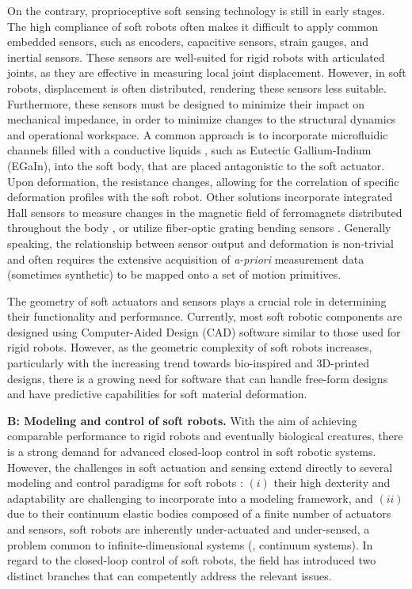On the contrary, proprioceptive soft sensing technology is still in early stages. The high compliance of soft robots often makes it difficult to apply common embedded sensors, such as encoders, capacitive sensors, strain gauges, and inertial sensors. These sensors are well-suited for rigid robots with articulated joints, as they are effective in measuring local joint displacement. However, in soft robots, displacement is often distributed, rendering these sensors less suitable. Furthermore, these sensors must be designed to minimize their impact on mechanical impedance, in order to minimize changes to the structural dynamics and operational workspace. A common approach is to incorporate microfluidic channels filled with a conductive liquids \cite{Tapia2020,Teng2018,Park2012}, such as Eutectic Gallium-Indium (EGaIn), into the soft body, that are placed antagonistic to the soft actuator. Upon deformation, the resistance changes, allowing for the correlation of specific deformation profiles with the soft robot. Other solutions incorporate integrated Hall sensors to measure changes in the magnetic field of ferromagnets distributed throughout the body \cite{Baaij2023,Skorina2017Jan}, or utilize fiber-optic grating bending sensors \cite{Galloway2019}. Generally speaking, the relationship between sensor output and deformation is non-trivial and often requires the extensive acquisition of \textit{a-priori} measurement data (sometimes synthetic) to be mapped onto a set of motion primitives.

The geometry of soft actuators and sensors plays a crucial role in determining their functionality and performance. Currently, most soft robotic components are designed using Computer-Aided Design (CAD) software similar to those used for rigid robots. However, as the geometric complexity of soft robots increases, particularly with the increasing trend towards bio-inspired and 3D-printed designs, there is a growing need for software that can handle free-form designs and have predictive capabilities for soft material deformation.

\textbf{B: Modeling and control of soft robots.} With the aim of achieving comparable performance to rigid robots and eventually biological creatures, there is a strong demand for advanced closed-loop control in soft robotic systems. However, the challenges in soft actuation and sensing extend directly to several modeling and control paradigms for soft robots \cite{Armanini2023,DellaSantina2021}: $(i)$ their high dexterity and adaptability are challenging to incorporate into a modeling framework, and $(ii)$ due to their continuum elastic bodies composed of a finite number of actuators and sensors, soft robots are inherently under-actuated and under-sensed, a problem common to infinite-dimensional systems (\eg, continuum systems). In regard to the closed-loop control of soft robots, the field has introduced two distinct branches that can competently address the relevant issues.

